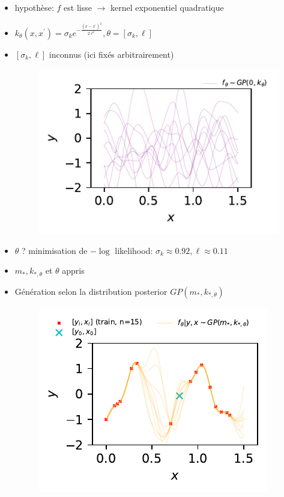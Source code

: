\documentclass[xcolor=svgnames, t]{beamer}
\begin{document}
\begin{frame}{\subsecname}
  \begin{itemize}
    \item<1-> hypothèse: $f$ est lisse $\rightarrow$ kernel exponentiel quadratique
    \item $k_\theta (x, x^\prime) = \sigma_k e^{- \frac{(x - x^\prime)^2}{2 \ell^2} }, \theta = [\sigma_k, \ell]$
    \item<2-> $[\sigma_k, \ell]$ inconnus (ici fixés arbitrairement)
      \begin{figure}
        \includegraphics{gp_1D_example_noisefree_data_prior.pdf}
      \end{figure}    
  \end{itemize}
\end{frame}

\begin{frame}{\subsecname}
  \begin{itemize}
    \item<1-> $\theta$ ? minimisation de $-\log$ likelihood: $\sigma_k \approx 0.92, \ell \approx 0.11$
    \item<2-> $m_{*}, k_{*, \theta}$ et $\theta$ appris
    \item<3-> Génération selon la distribution posterior $GP( m_{*}, k_{*, \theta} )$
      \begin{figure}
        \includegraphics{gp_1D_example_noisefree_pred.pdf}
      \end{figure}
  \end{itemize}
\end{frame}
\end{document}
